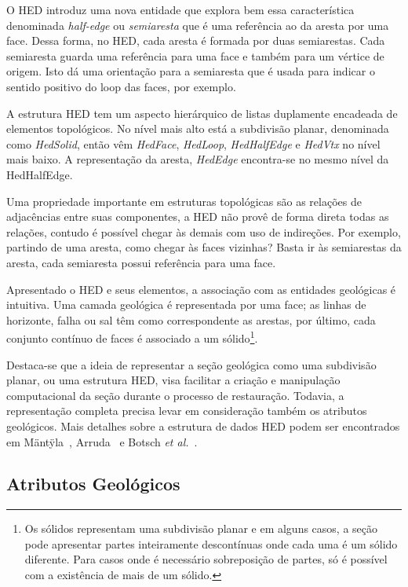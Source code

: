O HED introduz uma nova entidade que explora bem essa característica denominada \textit{half-edge} ou \textit{semiaresta} que é uma referência ao  da aresta por uma face. Dessa forma, no HED, cada aresta é formada por duas semiarestas. Cada semiaresta guarda uma referência para uma face e também para um vértice de origem. Isto dá uma orientação para a semiaresta que é usada para indicar o sentido positivo do loop das faces, por exemplo.

A estrutura HED tem um aspecto hierárquico de listas duplamente encadeada de elementos topológicos. No nível mais alto está a subdivisão planar, denominada como \textit{HedSolid}, então vêm \textit{HedFace}, \textit{HedLoop}, \textit{HedHalfEdge} e \textit{HedVtx} no nível mais baixo. A representação da aresta, \textit{HedEdge} encontra-se no mesmo nível da HedHalfEdge.

Uma propriedade importante em estruturas topológicas são as relações de adjacências entre suas componentes, a HED não provê de forma direta todas as relações, contudo é possível chegar às demais com uso de indireções. Por exemplo, partindo de uma aresta, como chegar às faces vizinhas? Basta ir às semiarestas da aresta, cada semiaresta possui referência para uma face.

Apresentado o HED e seus elementos, a associação com as entidades geológicas é intuitiva. Uma camada geológica é representada por uma face; as linhas de horizonte, falha ou sal têm como correspondente as arestas, por último, cada conjunto contínuo de faces é associado a um sólido\footnote{Os sólidos representam uma subdivisão planar e em alguns casos, a seção pode apresentar partes inteiramente descontínuas onde cada uma é um sólido diferente. Para casos onde é necessário sobreposição de partes, só é possível com a existência de mais de um sólido.}.

Destaca-se que a ideia de representar a seção geológica como uma subdivisão planar, ou uma estrutura HED, visa facilitar a criação e manipulação computacional da seção durante o processo de restauração. Todavia, a representação completa precisa levar em consideração também os atributos geológicos. Mais detalhes sobre a estrutura de dados HED podem ser encontrados em Mäntÿla~\cite{HED}, Arruda~\cite{Arruda} e Botsch \textit{et al.}~\cite{Botsch}.

\subsection{Atributos Geológicos}


